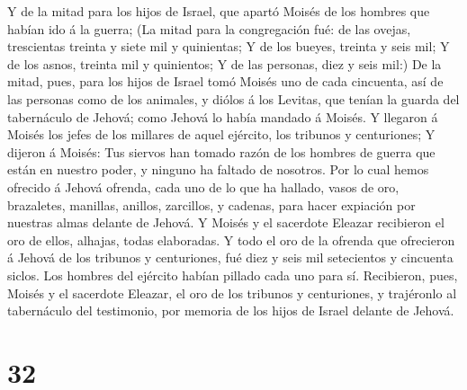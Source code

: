  Y de la mitad para los hijos de Israel, que apartó
Moisés de los hombres que habían ido á la guerra;  (La
mitad para la congregación fué: de las ovejas, trescientas treinta y
siete mil y quinientas;  Y de los bueyes, treinta y seis
mil;  Y de los asnos, treinta mil y quinientos;
 Y de las personas, diez y seis mil:)  De
la mitad, pues, para los hijos de Israel tomó Moisés uno de cada
cincuenta, así de las personas como de los animales, y diólos á los
Levitas, que tenían la guarda del tabernáculo de Jehová; como Jehová lo
había mandado á Moisés.  Y llegaron á Moisés los jefes de
los millares de aquel ejército, los tribunos y centuriones;
 Y dijeron á Moisés: Tus siervos han tomado razón de los
hombres de guerra que están en nuestro poder, y ninguno ha faltado de
nosotros.  Por lo cual hemos ofrecido á Jehová ofrenda,
cada uno de lo que ha hallado, vasos de oro, brazaletes, manillas,
anillos, zarcillos, y cadenas, para hacer expiación por nuestras almas
delante de Jehová.  Y Moisés y el sacerdote Eleazar
recibieron el oro de ellos, alhajas, todas elaboradas.  Y
todo el oro de la ofrenda que ofrecieron á Jehová de los tribunos y
centuriones, fué diez y seis mil setecientos y cincuenta siclos.
 Los hombres del ejército habían pillado cada uno para
sí.  Recibieron, pues, Moisés y el sacerdote Eleazar, el
oro de los tribunos y centuriones, y trajéronlo al tabernáculo del
testimonio, por memoria de los hijos de Israel delante de Jehová.

\hypertarget{section-31}{%
\section{32}\label{section-31}}

